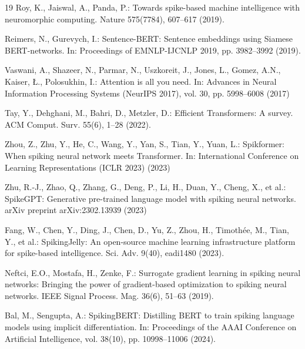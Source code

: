 \documentclass[runningheads]{llncs}
\begin{document}
\begin{thebibliography}{19}
Roy, K., Jaiswal, A., Panda, P.: Towards spike-based machine intelligence with neuromorphic computing. Nature 575(7784), 607--617 (2019). 

Reimers, N., Gurevych, I.: Sentence-BERT: Sentence embeddings using Siamese BERT-networks. In: Proceedings of EMNLP-IJCNLP 2019, pp. 3982--3992 (2019). 

Vaswani, A., Shazeer, N., Parmar, N., Uszkoreit, J., Jones, L., Gomez, A.N., Kaiser, {\L}., Polosukhin, I.: Attention is all you need. In: Advances in Neural Information Processing Systems (NeurIPS 2017), vol. 30, pp. 5998--6008 (2017)

Tay, Y., Dehghani, M., Bahri, D., Metzler, D.: Efficient Transformers: A survey. ACM Comput. Surv. 55(6), 1--28 (2022). 

Zhou, Z., Zhu, Y., He, C., Wang, Y., Yan, S., Tian, Y., Yuan, L.: Spikformer: When spiking neural network meets Transformer. In: International Conference on Learning Representations (ICLR 2023) (2023)

Zhu, R.-J., Zhao, Q., Zhang, G., Deng, P., Li, H., Duan, Y., Cheng, X., et al.: SpikeGPT: Generative pre-trained language model with spiking neural networks. arXiv preprint arXiv:2302.13939 (2023)

Fang, W., Chen, Y., Ding, J., Chen, D., Yu, Z., Zhou, H., Timoth{\'e}e, M., Tian, Y., et al.: SpikingJelly: An open-source machine learning infrastructure platform for spike-based intelligence. Sci. Adv. 9(40), eadi1480 (2023). 

Neftci, E.O., Mostafa, H., Zenke, F.: Surrogate gradient learning in spiking neural networks: Bringing the power of gradient-based optimization to spiking neural networks. IEEE Signal Process. Mag. 36(6), 51--63 (2019). 

Bal, M., Sengupta, A.: SpikingBERT: Distilling BERT to train spiking language models using implicit differentiation. In: Proceedings of the AAAI Conference on Artificial Intelligence, vol. 38(10), pp. 10998--11006 (2024). 


\end{thebibliography}
\end{document}
